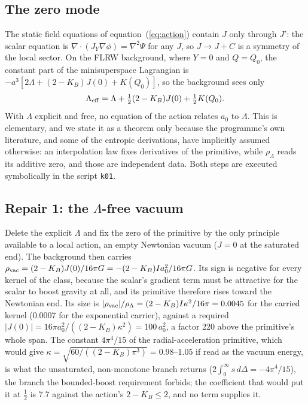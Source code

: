 \documentclass[fleqn,usenatbib]{mnras}
\begin{document}
\subsection{The zero mode}
The static field equations of equation~(\ref{eq:action}) contain $J$ only through $J'$: the scalar equation is $\nabla\!\cdot\!(J_Y\nabla\phi)=\nabla^2\Psi$ for any $J$, so $J\to J+C$ is a symmetry of the local sector. On the FLRW background, where $Y=0$ and $Q=Q_0$, the constant part of the minisuperspace Lagrangian is $-a^3[2\Lambda+(2-K_B)J(0)+K(Q_0)]$, so the background sees only
\begin{equation}
\Lambda_{\rm eff}=\Lambda+\tfrac12(2-K_B)J(0)+\tfrac12K(Q_0).
\end{equation}
With $\Lambda$ explicit and free, no equation of the action relates $a_0$ to $\Lambda$. This is elementary, and we state it as a theorem only because the programme's own literature, and some of the entropic derivations, have implicitly assumed otherwise: an interpolation law fixes derivatives of the primitive, while $\rho_\Lambda$ reads its additive zero, and those are independent data. Both steps are executed symbolically in the script \texttt{k01}.

\subsection{Repair 1: the $\Lambda$-free vacuum}
Delete the explicit $\Lambda$ and fix the zero of the primitive by the only principle available to a local action, an empty Newtonian vacuum ($J=0$ at the saturated end). The background then carries $\rho_{\rm vac}=(2-K_B)J(0)/16\pi G=-(2-K_B)Ia_0^2/16\pi G$. Its sign is negative for every kernel of the class, because the scalar's gradient term must be attractive for the scalar to boost gravity at all, and its primitive therefore rises toward the Newtonian end. Its size is $|\rho_{\rm vac}|/\rho_\Lambda=(2-K_B)I\kappa^2/16\pi=0.0045$ for the carried kernel (0.0007 for the exponential carrier), against a required $|J(0)|=16\pi a_0^2/((2-K_B)\kappa^2)=100\,a_0^2$, a factor 220 above the primitive's whole span. The constant $4\pi^4/15$ of the radial-acceleration primitive, which would give $\kappa=\sqrt{60/((2-K_B)\pi^3)}=0.98$--$1.05$ if read as the vacuum energy, is what the unsaturated, non-monotone branch returns ($2\int_0^\infty s\,d\Delta=-4\pi^4/15$), the branch the bounded-boost requirement forbids; the coefficient that would put it at $\tfrac12$ is 7.7 against the action's $2-K_B\le2$, and no term supplies it.
\end{document}
